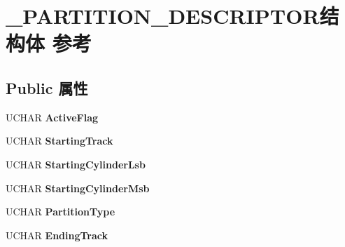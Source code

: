 \hypertarget{struct___p_a_r_t_i_t_i_o_n___d_e_s_c_r_i_p_t_o_r}{}\section{\+\_\+\+P\+A\+R\+T\+I\+T\+I\+O\+N\+\_\+\+D\+E\+S\+C\+R\+I\+P\+T\+O\+R结构体 参考}
\label{struct___p_a_r_t_i_t_i_o_n___d_e_s_c_r_i_p_t_o_r}
\subsection*{Public 属性}
\begin{DoxyCompactItemize}
\item 
\mbox{\label{struct___p_a_r_t_i_t_i_o_n___d_e_s_c_r_i_p_t_o_r_af53a804a8c8193ad7a365dbd7e3332df}} 
U\+C\+H\+AR {\bfseries Active\+Flag}
\item 
\mbox{\label{struct___p_a_r_t_i_t_i_o_n___d_e_s_c_r_i_p_t_o_r_a7092867dcbd0205630c9ad98b898ac3b}} 
U\+C\+H\+AR {\bfseries Starting\+Track}
\item 
\mbox{\label{struct___p_a_r_t_i_t_i_o_n___d_e_s_c_r_i_p_t_o_r_a67fbca909ba17a75ccd95bbcf79d2c60}} 
U\+C\+H\+AR {\bfseries Starting\+Cylinder\+Lsb}
\item 
\mbox{\label{struct___p_a_r_t_i_t_i_o_n___d_e_s_c_r_i_p_t_o_r_a997933e799c7fb130457aa89dfd7fe5e}} 
U\+C\+H\+AR {\bfseries Starting\+Cylinder\+Msb}
\item 
\mbox{\label{struct___p_a_r_t_i_t_i_o_n___d_e_s_c_r_i_p_t_o_r_a6785cc525ed4d631e45bdef0d64b5604}} 
U\+C\+H\+AR {\bfseries Partition\+Type}
\item 
\mbox{\label{struct___p_a_r_t_i_t_i_o_n___d_e_s_c_r_i_p_t_o_r_a137748265558eb17d01b4e95c8422321}} 
U\+C\+H\+AR {\bfseries Ending\+Track}
\item 
\mbox{\label{struct___p_a_r_t_i_t_i_o_n___d_e_s_c_r_i_p_t_o_r_affd1ef80b969223a33d1b6490ca7f17f}} 

\end{DoxyCompactItemize}
